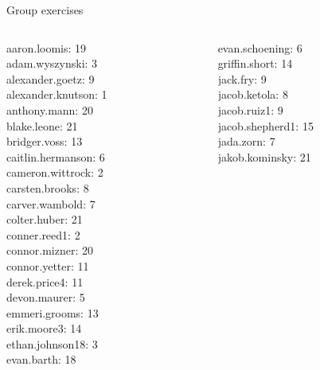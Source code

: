 \documentclass[10pt]{beamer}
\begin{document}
\begin{frame}
\begin{myredbox}[title=\text{Solution(s):  \; The solution depends on what's meant by \enquote{randomly}!}]
\begin{enumerate}
\end{enumerate}
\end{myredbox}

\end{frame}





\begin{frame}[standout]
Group exercises
\end{frame}

\begin{frame}
\footnotesize 
\vfill 
\begin{columns}
\begin{column}{0.33\textwidth}
aaron.loomis: 19 \\ 
adam.wyszynski: 3 \\ 
alexander.goetz: 9 \\ 
alexander.knutson: 1 \\ 
anthony.mann: 20 \\ 
blake.leone: 21 \\ 
bridger.voss: 13 \\ 
caitlin.hermanson: 6 \\ 
cameron.wittrock: 2 \\ 
carsten.brooks: 8 \\ 
carver.wambold: 7 \\ 
colter.huber: 21 \\ 
conner.reed1: 2 \\ 
connor.mizner: 20 \\ 
connor.yetter: 11 \\ 
derek.price4: 11 \\ 
devon.maurer: 5 \\ 
emmeri.grooms: 13 \\ 
erik.moore3: 14 \\ 
ethan.johnson18: 3 \\ 
evan.barth: 18 \\\end{column}
\begin{column}{0.33\textwidth}
evan.schoening: 6 \\ 
griffin.short: 14 \\ 
jack.fry: 9 \\ 
jacob.ketola: 8 \\ 
jacob.ruiz1: 9 \\ 
jacob.shepherd1: 15 \\ 
jada.zorn: 7 \\ 
jakob.kominsky: 21 \\ 

\end{column}
\end{columns}
\end{frame}
\end{document}
